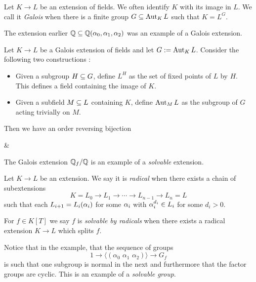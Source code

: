\documentclass{article}
\begin{document}
\begin{dfn}

  Let $K \to L$ be an extension of fields.
  We often identify $K$ with its image in $L$.
  We call it \emph{Galois} when there is a finite group $G \subseteq \operatorname{Aut}_K L$
  such that $K = L^G$. 
\end{dfn}
The extension earlier $\mathbb{Q} \subseteq \mathbb{Q}(\alpha_0 , \alpha_1 , \alpha_2)$ was an example
of a Galois extension.
\begin{prop}

  Let $K \to L$ be a Galois extension of fields
  and let $G := \operatorname{Aut}_K L$.
  Consider the following two constructions : 
  \begin{itemize}
    \item Given a subgroup $H \subseteq G$,
    define $L^H$ as the set of fixed points of $L$ by $H$.
    This defines a field containing the image of $K$.
    \item Given a subfield $M \subseteq L$ containing $K$,
    define $\operatorname{Aut}_M L$ as the subgroup of $G$ acting trivially on $M$.
  \end{itemize}
  Then we have an order reversing bijection \begin{cd}
    {} & {}
    \arrow["{\mathrm{Aut}_\_ L}", shift left=3, from=1-1, to=1-2]
    \arrow["\simeq"{description}, draw=none, from=1-1, to=1-2]
    \arrow["{L^\_}", shift left=3, from=1-2, to=1-1]
  \end{cd}
\end{prop}
The Galois extension $\mathbb{Q}_f / \mathbb{Q}$ is an example of a \emph{solvable} extension.
\begin{dfn}

  Let $K \to L$ be an extension.
  We say it is \emph{radical} when
  there exists a chain of subextensions 
  \[
    K = L_0 \to L_1 \to \cdots \to L_{n-1} \to L_n = L
  \]
  such that each $L_{i+1} = L_i(\alpha_i)$
  for some $\alpha_i$ with $\alpha_i^{d_i} \in L_i$ for some $d_i > 0$.

  For $f \in K[T]$ we say $f$ is \emph{solvable by radicals} when
  there exists a radical extension $K \to L$ which splits $f$.
\end{dfn}

Notice that in the example, that the sequence of groups 
\[
  1 \to \langle(\alpha_0 \,\,\alpha_1 \,\,\alpha_2)\rangle \to G_f
\]
is such that one subgroup is normal in the next
and furthermore that the factor groups are cyclic.
This is an example of a \emph{solvable group}.
\end{document}
